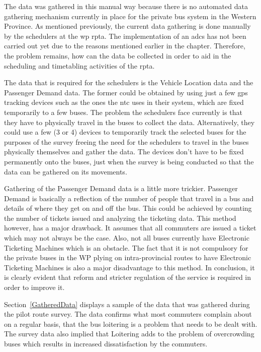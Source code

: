 The data was gathered in this manual way because there is no automated data gathering mechanism currently in place for the private bus system in the Western Province. As mentioned previously, the current data gathering is done manually by the schedulers at the \acrshort{wp} \acrshort{rpta}. The implementation of an \acrshort{adcs} has not been carried out yet due to the reasons mentioned earlier in the chapter. Therefore, the problem remains, how can the data be collected in order to aid in the scheduling and timetabling activities of the \acrshort{rpta}.

The data that is required for the schedulers is the Vehicle Location data and the Passenger Demand data. The former could be obtained by using just a few \acrshort{gps} tracking devices such as the ones the \acrshort{ntc} uses in their system, which are fixed temporarily to a few buses. The problem the schedulers face currently is that they have to physically travel in the buses to collect the data. Alternatively, they could use a few (3 or 4) devices to temporarily track the selected buses for the purposes of the survey freeing the need for the schedulers to travel in the buses physically themselves and gather the data. The devices don't have to be fixed permanently onto the buses, just when the survey is being conducted so that the data can be gathered on its movements.

Gathering of the Passenger Demand data is a little more trickier. Passenger Demand is basically a reflection of the number of people that travel in a bus and details of where they get on and off the bus. This could be achieved by counting the number of tickets issued and analyzing the ticketing data. This method however, has a major drawback. It assumes that all commuters are issued a ticket which may not always be the case. Also, not all buses currently have Electronic Ticketing Machines which is an obstacle. The fact that it is not compulsory for the private buses in the WP plying on intra-provincial routes to have Electronic Ticketing Machines is also a major disadvantage to this method. In conclusion, it is clearly evident that reform and stricter regulation of the service is required in order to improve it.

Section~\ref{GatheredData} displays a sample of the data that was gathered during the pilot route survey. The data confirms what most commuters complain about on a regular basis, that the bus loitering is a problem that needs to be dealt with. The survey data also implied that Loitering adds to the problem of overcrowding buses which results in increased dissatisfaction by the commuters.

